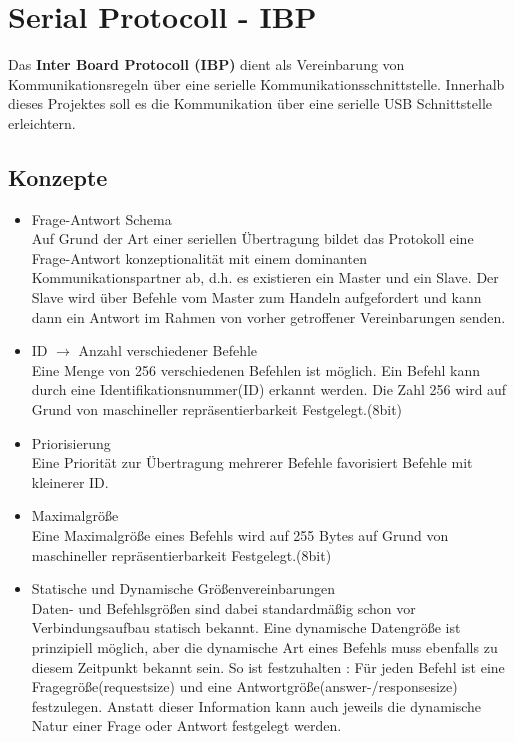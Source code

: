 
\section{Serial Protocoll - IBP}
Das \textbf{Inter Board Protocoll (IBP)} dient als Vereinbarung von Kommunikationsregeln über eine serielle Kommunikationsschnittstelle.
Innerhalb dieses Projektes soll es die Kommunikation über eine serielle USB Schnittstelle erleichtern.

\subsection{Konzepte}

\begin{itemize}
	\item Frage-Antwort Schema\\
Auf Grund der Art einer seriellen Übertragung bildet das Protokoll eine Frage-Antwort konzeptionalität mit einem dominanten Kommunikationspartner ab, d.h. es existieren ein Master und ein Slave. Der Slave wird über Befehle vom Master zum Handeln aufgefordert und kann dann ein Antwort im Rahmen von vorher getroffener Vereinbarungen senden.

	\item ID $ \rightarrow $ Anzahl verschiedener Befehle\\
Eine Menge von 256 verschiedenen Befehlen ist möglich. Ein Befehl kann durch eine Identifikationsnummer(ID) erkannt werden. Die Zahl 256 wird auf Grund von maschineller repräsentierbarkeit Festgelegt.(8bit)

	\item Priorisierung\\
Eine Priorität zur Übertragung mehrerer Befehle favorisiert Befehle mit kleinerer ID.

	\item Maximalgröße\\
Eine Maximalgröße eines Befehls wird auf 255 Bytes auf Grund von maschineller repräsentierbarkeit Festgelegt.(8bit)

	\item Statische und Dynamische Größenvereinbarungen\\
Daten- und Befehlsgrößen sind dabei standardmäßig schon vor Verbindungsaufbau statisch bekannt. Eine dynamische Datengröße ist prinzipiell möglich, aber die dynamische Art eines Befehls muss ebenfalls zu diesem Zeitpunkt bekannt sein. So ist festzuhalten : Für jeden Befehl ist eine Fragegröße(requestsize) und eine Antwortgröße(answer-/responsesize) festzulegen. Anstatt dieser Information kann auch jeweils die dynamische Natur einer Frage oder Antwort festgelegt werden.


\end{itemize}

